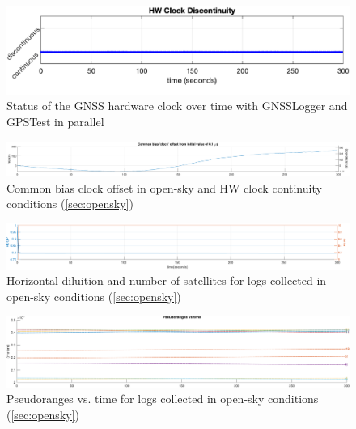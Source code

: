 \begin{figure}[H]
        \centering
        \includegraphics[width=0.85\linewidth]{images/continuity_gnss_log.png}
        \caption{Status of the GNSS hardware clock over time with GNSSLogger and GPSTest in parallel}
        \label{fig:GNSSLogger-continuity}
\end{figure}

\begin{figure}[H]
    \centering
    \includegraphics[width=0.95\linewidth]{images/continuity_bias_clock.pdf}
    \caption{Common bias clock offset in open-sky and HW clock continuity conditions (\ref{sec:opensky})} 
    \label{fig:continuity_bias_clock}
\end{figure}


\begin{figure}[H]
    \centering
    \includegraphics[width=1.00
    \linewidth]{images/hdop_punto_3.pdf}
    \caption{Horizontal diluition and number of satellites for logs collected in open-sky conditions (\ref{sec:opensky})}
    \label{fig:hdop_punto_3}
\end{figure}

\begin{figure}[H]
    \centering
    \includegraphics[width=1.00
    \linewidth]{images/punto3_pseudoranges.pdf}
    \caption{Pseudoranges vs. time for logs collected in open-sky conditions (\ref{sec:opensky})}
    \label{fig:pseudoranges_opensky}
\end{figure}

